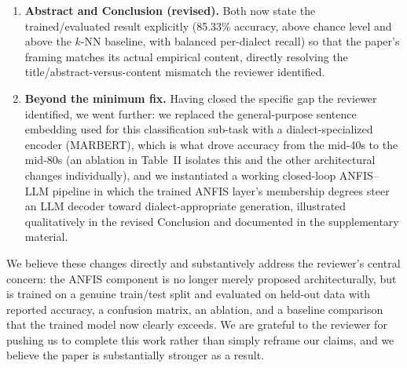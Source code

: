 \documentclass[11pt]{article}
\begin{document}
\begin{enumerate}
\item \textbf{Abstract and Conclusion (revised).} Both now state the trained/evaluated result explicitly (85.33\% accuracy, above chance level and above the $k$-NN baseline, with balanced per-dialect recall) so that the paper's framing matches its actual empirical content, directly resolving the title/abstract-versus-content mismatch the reviewer identified.

\item \textbf{Beyond the minimum fix.} Having closed the specific gap the reviewer identified, we went further: we replaced the general-purpose sentence embedding used for this classification sub-task with a dialect-specialized encoder (MARBERT), which is what drove accuracy from the mid-40s to the mid-80s (an ablation in Table~II isolates this and the other architectural changes individually), and we instantiated a working closed-loop ANFIS--LLM pipeline in which the trained ANFIS layer's membership degrees steer an LLM decoder toward dialect-appropriate generation, illustrated qualitatively in the revised Conclusion and documented in the supplementary material.
\end{enumerate}

We believe these changes directly and substantively address the reviewer's central concern: the ANFIS component is no longer merely proposed architecturally, but is trained on a genuine train/test split and evaluated on held-out data with reported accuracy, a confusion matrix, an ablation, and a baseline comparison that the trained model now clearly exceeds. We are grateful to the reviewer for pushing us to complete this work rather than simply reframe our claims, and we believe the paper is substantially stronger as a result.
\end{document}
